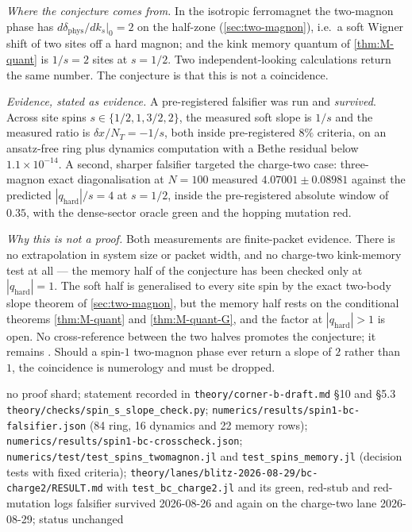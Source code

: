 \noindent\emph{Where the conjecture comes from.} In the isotropic ferromagnet
the two-magnon phase has $d\delta_{\mathrm{phys}}/dk_s|_0=2$ on the half-zone
(\cref{sec:two-magnon}), i.e.\ a soft Wigner shift of two sites off a hard
magnon; and the kink memory quantum of \cref{thm:M-quant} is $1/s=2$ sites at
$s=1/2$. Two independent-looking calculations return the same number. The
conjecture is that this is not a coincidence.

\smallskip
\noindent\emph{Evidence, stated as evidence.} A pre-registered falsifier was run
and \emph{survived}. Across site spins $s\in\{1/2,1,3/2,2\}$, the measured soft
slope is $1/s$ and the measured ratio is $\delta x/N_T=-1/s$, both inside
pre-registered $8\%$ criteria, on an ansatz-free ring plus dynamics computation
with a Bethe residual below $1.1\times10^{-14}$. A second, sharper falsifier
targeted the charge-two case: three-magnon exact diagonalisation at $N=100$
measured $4.07001\pm0.08981$ against the predicted $|q_{\mathrm{hard}}|/s=4$ at
$s=1/2$, inside the pre-registered absolute window of $0.35$, with the
dense-sector oracle green and the hopping mutation red.

\smallskip
\noindent\emph{Why this is not a proof.} Both measurements are finite-packet
evidence. There is no extrapolation in system size or packet width, and no
charge-two kink-memory test at all --- the memory half of the conjecture has
been checked only at $|q_{\mathrm{hard}}|=1$. The soft half is generalised to
every site spin by the exact two-body slope theorem of \cref{sec:two-magnon},
but the memory half rests on the conditional theorems \cref{thm:M-quant} and
\cref{thm:M-quant-G}, and the factor at $|q_{\mathrm{hard}}|>1$ is open. No
cross-reference between the two halves promotes the conjecture; it remains
\statusConjecture. Should a spin-$1$ two-magnon phase ever return a slope of $2$
rather than $1$, the coincidence is numerology and must be dropped.

%
{no proof shard; statement recorded in \texttt{theory/corner-b-draft.md} \S10
 and \S5.3}%
{\texttt{theory/checks/spin\_s\_slope\_check.py};
 \texttt{numerics/results/spin1-bc-falsifier.json} (84 ring, 16 dynamics and
 22 memory rows); \texttt{numerics/results/spin1-bc-crosscheck.json};
 \texttt{numerics/test/test\_spins\_twomagnon.jl} and
 \texttt{test\_spins\_memory.jl} (decision tests with fixed criteria);
 \texttt{theory/lanes/blitz-2026-08-29/bc-charge2/RESULT.md} with
 \texttt{test\_bc\_charge2.jl} and its green, red-stub and red-mutation logs}%
{falsifier survived 2026-08-26 and again on the charge-two lane 2026-08-29;
 status unchanged}
